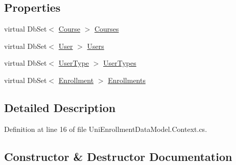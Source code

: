 \subsection*{Properties}
\begin{DoxyCompactItemize}
\item 
virtual Db\+Set$<$ \hyperlink{class_uni_enrollment___m_v_c_1_1_models_1_1_course}{Course} $>$ \hyperlink{class_uni_enrollment___m_v_c_1_1_models_1_1_uni_enrollment_d_b_entities_a86c01bebd8432c0e61ce61c767697781}{Courses}
\item 
virtual Db\+Set$<$ \hyperlink{class_uni_enrollment___m_v_c_1_1_models_1_1_user}{User} $>$ \hyperlink{class_uni_enrollment___m_v_c_1_1_models_1_1_uni_enrollment_d_b_entities_a440328d8247deb97dd72f9aede6f6ecc}{Users}
\item 
virtual Db\+Set$<$ \hyperlink{class_uni_enrollment___m_v_c_1_1_models_1_1_user_type}{User\+Type} $>$ \hyperlink{class_uni_enrollment___m_v_c_1_1_models_1_1_uni_enrollment_d_b_entities_ae1554ac52bfff62c2ceb2edc182e8ee6}{User\+Types}
\item 
virtual Db\+Set$<$ \hyperlink{class_uni_enrollment___m_v_c_1_1_models_1_1_enrollment}{Enrollment} $>$ \hyperlink{class_uni_enrollment___m_v_c_1_1_models_1_1_uni_enrollment_d_b_entities_a7ca0bed1f5761f9a747ac39615d0e95d}{Enrollments}
\end{DoxyCompactItemize}


\subsection{Detailed Description}


Definition at line 16 of file Uni\+Enrollment\+Data\+Model.\+Context.\+cs.



\subsection{Constructor \& Destructor Documentation}
